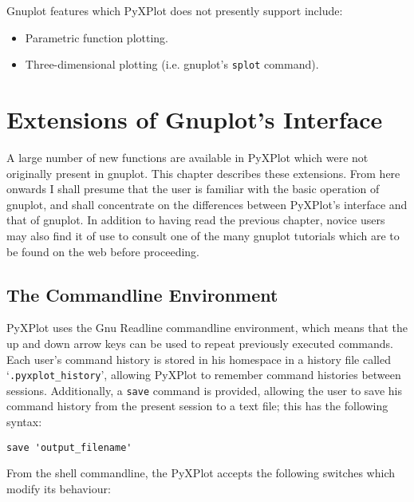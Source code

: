 \documentclass[a4paper,onecolumn,11pt]{book}
\begin{document}
Gnuplot features which PyXPlot does not presently support include:

\begin{itemize}
\item Parametric function plotting.
\item Three-dimensional plotting (i.e. gnuplot's \texttt{splot} command).
\end{itemize}

\chapter{Extensions of Gnuplot's Interface}
\label{new_features}

A large number of new functions are available in PyXPlot which were not
originally present in gnuplot. This chapter describes these extensions.  From
here onwards I shall presume that the user is familiar with the basic operation
of gnuplot, and shall concentrate on the differences between PyXPlot's
interface and that of gnuplot. In addition to having read the previous chapter,
novice users may also find it of use to consult one of the many gnuplot
tutorials which are to be found on the web before proceeding.

\section{The Commandline Environment}

PyXPlot uses the Gnu Readline commandline environment, which means that the up
and down arrow keys can be used to repeat previously executed commands. Each
user's command history is stored in his homespace in a history file called
`\texttt{.pyxplot\_history}', allowing PyXPlot to remember command histories
between sessions. Additionally, a \texttt{save} command is provided, allowing
the user to save his command history from the present session to a text file;
this has the following syntax:

\begin{verbatim}
save 'output_filename'
\end{verbatim}

From the shell commandline, the PyXPlot accepts the following switches which
modify its behaviour:
\end{document}
